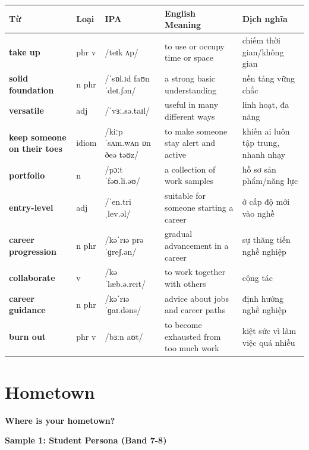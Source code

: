\vspace{0.8em}
\begin{center}
\renewcommand{\arraystretch}{1.65}
\begin{tabularx}{\textwidth}{|V{0.22\textwidth}|C{0.07\textwidth}|I{0.20\textwidth}|Y|V{0.18\textwidth}|}
\hline
{}
\textbf{Từ} & \textbf{Loại} & \textbf{IPA} & \textbf{English Meaning} & \textbf{Dịch nghĩa} \\
\hline
\textbf{take up} & phr v & /teɪk ʌp/ & to use or occupy time or space & chiếm thời gian/không gian \\ \hline
\textbf{solid foundation} & n phr & /ˈsɒl.ɪd faʊnˈdeɪ.ʃən/ & a strong basic understanding & nền tảng vững chắc \\ \hline
\textbf{versatile} & adj & /ˈvɜː.sə.taɪl/ & useful in many different ways & linh hoạt, đa năng \\ \hline
\textbf{keep someone on their toes} & idiom & /kiːp ˈsʌm.wʌn ɒn ðeə təʊz/ & to make someone stay alert and active & khiến ai luôn tập trung, nhanh nhạy \\ \hline
\textbf{portfolio} & n & /pɔːtˈfəʊ.li.əʊ/ & a collection of work samples & hồ sơ sản phẩm/năng lực \\ \hline
\textbf{entry-level} & adj & /ˈen.tri ˌlev.əl/ & suitable for someone starting a career & ở cấp độ mới vào nghề \\ \hline
\textbf{career progression} & n phr & /kəˈrɪə prəˈɡreʃ.ən/ & gradual advancement in a career & sự thăng tiến nghề nghiệp \\ \hline
\textbf{collaborate} & v & /kəˈlæb.ə.reɪt/ & to work together with others & cộng tác \\ \hline
\textbf{career guidance} & n phr & /kəˈrɪə ˈɡaɪ.dəns/ & advice about jobs and career paths & định hướng nghề nghiệp \\ \hline
\textbf{burn out} & phr v & /bɜːn aʊt/ & to become exhausted from too much work & kiệt sức vì làm việc quá nhiều \\ \hline
\end{tabularx}
\end{center}

\newpage

\section{Hometown}
\begin{ieltsquestion}
\textbf{Where is your hometown?}
\end{ieltsquestion}
\textbf{Sample 1: Student Persona (Band 7-8)}

